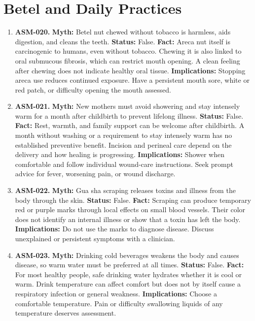 \documentclass[11pt,oneside]{book}
\begin{document}
\section{Betel and Daily Practices}
\begin{enumerate}[leftmargin=0pt,labelwidth=0pt,labelsep=0pt,itemindent=0pt]
\item[] \textbf{ASM-020.} \textbf{Myth:} Betel nut chewed without tobacco is harmless, aids digestion, and cleans the teeth.\newline
\textbf{Status:} False.\newline
\textbf{Fact:} Areca nut itself is carcinogenic to humans, even without tobacco. Chewing it is also linked to oral submucous fibrosis, which can restrict mouth opening. A clean feeling after chewing does not indicate healthy oral tissue. \cite{ref148}\newline
\textbf{Implications:} Stopping areca use reduces continued exposure. Have a persistent mouth sore, white or red patch, or difficulty opening the mouth assessed.
\item[] \textbf{ASM-021.} \textbf{Myth:} New mothers must avoid showering and stay intensely warm for a month after childbirth to prevent lifelong illness.\newline
\textbf{Status:} False.\newline
\textbf{Fact:} Rest, warmth, and family support can be welcome after childbirth. A month without washing or a requirement to stay intensely warm has no established preventive benefit. Incision and perineal care depend on the delivery and how healing is progressing. \cite{ref149}\newline
\textbf{Implications:} Shower when comfortable and follow individual wound-care instructions. Seek prompt advice for fever, worsening pain, or wound discharge.
\item[] \textbf{ASM-022.} \textbf{Myth:} Gua sha scraping releases toxins and illness from the body through the skin.\newline
\textbf{Status:} False.\newline
\textbf{Fact:} Scraping can produce temporary red or purple marks through local effects on small blood vessels. Their color does not identify an internal illness or show that a toxin has left the body. \cite{ref205}\newline
\textbf{Implications:} Do not use the marks to diagnose disease. Discuss unexplained or persistent symptoms with a clinician.
\item[] \textbf{ASM-023.} \textbf{Myth:} Drinking cold beverages weakens the body and causes disease, so warm water must be preferred at all times.\newline
\textbf{Status:} False.\newline
\textbf{Fact:} For most healthy people, safe drinking water hydrates whether it is cool or warm. Drink temperature can affect comfort but does not by itself cause a respiratory infection or general weakness. \cite{ref4,ref292}\newline
\textbf{Implications:} Choose a comfortable temperature. Pain or difficulty swallowing liquids of any temperature deserves assessment.
\end{enumerate}
\end{document}
